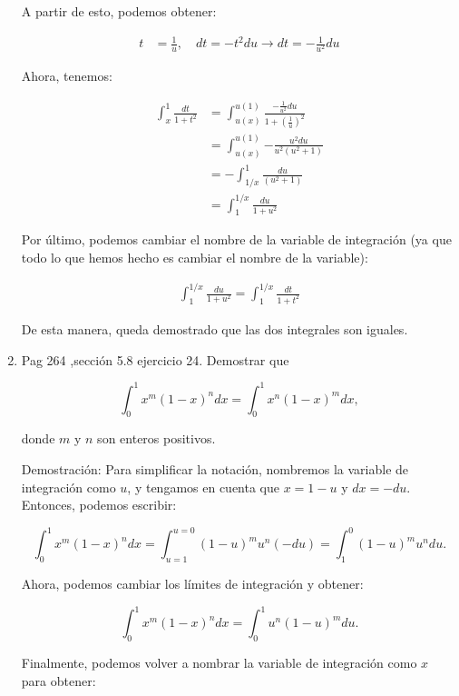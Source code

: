 \documentclass{report}
\begin{document}
\begin{enumerate}
        A partir de esto, podemos obtener:
        
        \begin{align*}
        t &= \frac{1}{u}, \quad dt = -t^2 du \rightarrow dt = -\frac{1}{u^2}du
        \end{align*}
        
        Ahora, tenemos:
        
        \begin{align*}
        \int_{x}^{1}\frac{dt}{1+t^2} &= \int_{u(x)}^{u(1)}\frac{-\frac{1}{u^2}du}{1+\left(\frac{1}{u}\right)^2} \\
        &= \int_{u(x)}^{u(1)}{-\frac{u^2du}{u^2(u^2+1)}} \\
        &= -\int_{1/x}^{1}\frac{du}{(u^2+1)} \\
        &= \int_{1}^{1/x}\frac{du}{1+u^2}
        \end{align*}
        
        Por último, podemos cambiar el nombre de la variable de integración (ya que todo lo que hemos hecho es cambiar el nombre de la variable):
        
        \begin{align*}
        \int_{1}^{1/x}\frac{du}{1+u^2} = \int_{1}^{1/x}\frac{dt}{1+t^2}
        \end{align*}
        
        De esta manera, queda demostrado que las dos integrales son iguales.
        
        \item Pag 264 ,sección 5.8 ejercicio 24. Demostrar que 
        
        \[\int_{0}^{1} x^{m}(1-x)^{n} dx = \int_{0}^{1} x^{n}(1-x)^{m} dx,\]
        
        donde $m$ y $n$ son enteros positivos.
        
        Demostración: Para simplificar la notación, nombremos la variable de integración como $u$, y tengamos en cuenta que $x = 1 - u$ y $dx = -du$. Entonces, podemos escribir:
        
        \[\int_{0}^{1} x^{m}(1-x)^{n} dx = \int_{u=1}^{u=0} (1 - u)^{m}u^{n} (-du) = \int_{1}^{0}(1 - u)^{m}u^{n}du.\]
        
        Ahora, podemos cambiar los límites de integración y obtener:
        
        \[\int_{0}^{1} x^{m}(1-x)^{n} dx = \int_{0}^{1} u^{n}(1 - u)^{m} du.\]
        
        Finalmente, podemos volver a nombrar la variable de integración como $x$ para obtener:
        

\end{enumerate}
\end{document}
